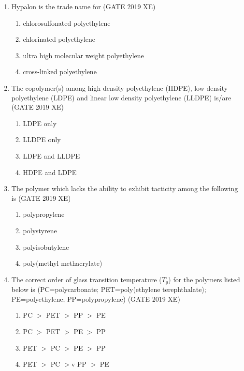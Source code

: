 \documentclass[journal,12pt,onecolumn]{IEEEtran}
\begin{document}
\begin{enumerate}
\item Hypalon is the trade name for
\hfill{(GATE 2019 XE)} \\
\begin{multicols}{2}
\begin{enumerate}
\item chlorosulfonated polyethylene
\item chlorinated polyethylene
\item ultra high molecular weight polyethylene
\item cross-linked polyethylene
\end{enumerate}
\end{multicols}

\item The copolymer(s) among high density polyethylene (HDPE), low density polyethylene (LDPE) and linear low density polyethylene (LLDPE) is/are
\hfill{(GATE 2019 XE)} \\
\begin{multicols}{2}
\begin{enumerate}
\item LDPE only
\item LLDPE only
\item LDPE and LLDPE
\item HDPE and LDPE
\end{enumerate}
\end{multicols}

\item The polymer which lacks the ability to exhibit tacticity among the following is
\hfill{(GATE 2019 XE)} \\
\begin{multicols}{2}
\begin{enumerate}
\item polypropylene
\item polystyrene
\item polyisobutylene
\item poly(methyl methacrylate)
\end{enumerate}
\end{multicols}

\item The correct order of glass transition temperature ($T_g$) for the polymers listed below is (PC=polycarbonate; PET=poly(ethylene terephthalate); PE=polyethylene; PP=polypropylene)
\hfill{(GATE 2019 XE)} \\
\begin{multicols}{2}
\begin{enumerate}
\item PC $>$ PET $>$ PP $>$ PE
\item PC $>$ PET $>$ PE $>$ PP
\item PET $>$ PC $>$ PE $>$ PP
\item PET $>$ PC $>$v PP $>$ PE
\end{enumerate}
\end{multicols}


\end{enumerate}
\end{document}

